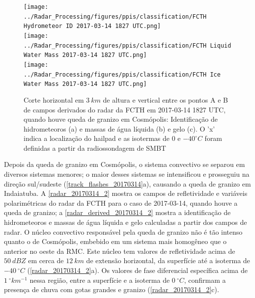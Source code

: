 \begin{figure}[hp]
	\centering
	\caption{Corte horizontal em $3\:km$ de altura e vertical entre os pontos A e B de campos derivados do radar da FCTH em 2017-03-14 1827 UTC, quando houve queda de granizo em Cosmópolis: Identificação de hidrometeoros (a) e massas de água líquida (b) e gelo (c). O 'x' indica a localização do hailpad e as isotermas de $0$ e $-40^{\circ}C$ foram definidas a partir da radiossondagem de SMBT} 
	\label{radar_derived_20170314_1}
	\vspace{-5pt}
	\texttt{[image: ../Radar\_Processing/figures/ppis/classification/FCTH Hydrometeor ID 2017-03-14 1827 UTC.png]} \\
	\vspace{-5pt}
	\texttt{[image: ../Radar\_Processing/figures/ppis/classification/FCTH Liquid Water Mass 2017-03-14 1827 UTC.png]} \\
	\vspace{-5pt}
	\texttt{[image: ../Radar\_Processing/figures/ppis/classification/FCTH Ice Water Mass 2017-03-14 1827 UTC.png]} \\
\end{figure}

Depois da queda de granizo em Cosmópolis, o sistema convectivo se separou em diversos sistemas menores; o maior desses sistemas se intensificou e prosseguiu na direção sul/sudeste (\autoref{track_flashes_20170314}a), causando a queda de granizo em Indaiatuba. A \autoref{radar_20170314_2} mostra os campos de refletividade e variáveis polarimétricas do radar da FCTH para o caso de 2017-03-14, quando houve a queda de granizo; a \autoref{radar_derived_20170314_2} mostra a identificação de hidrometeoros e massas de água líquida e gelo calculadas a partir dos campos de radar. O núcleo convectivo responsável pela queda de granizo não é tão intenso quanto o de Cosmópolis, embebido em um sistema mais homogêneo que o anterior no oeste da RMC. Este núcleo tem valores de refletividade acima de $50\:dBZ$ em cerca de $12\:km$ de extensão horizontal, da superfície até a isoterma de $-40\:^{\circ}C$ (\autoref{radar_20170314_2}a). Os valores de fase diferencial específica acima de $1\:^{\circ}km^{-1}$ nessa região, entre a superfície e a isoterma de $0\:^{\circ}C$, confirmam a presença de chuva com gotas grandes e granizo (\autoref{radar_20170314_2}c).

